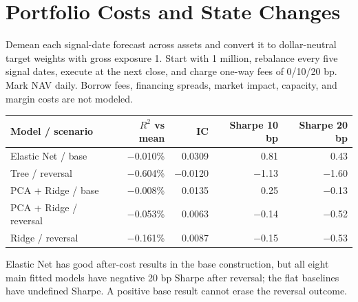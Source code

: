 \clearpage\section{Portfolio Costs and State Changes}
\begin{strand}
Demean each signal-date forecast across assets and convert it to dollar-neutral target weights with gross exposure 1. Start with 1 million, rebalance every five signal dates, execute at the next close, and charge one-way fees of 0/10/20 bp. Mark NAV daily. Borrow fees, financing spreads, market impact, capacity, and margin costs are not modeled.
\end{strand}
\begin{center}\small
\begin{tabular}{lrrrr}
\toprule
Model / scenario & \(R^2\) vs mean & IC & Sharpe 10 bp & Sharpe 20 bp\\
\midrule
Elastic Net / base & −0.010\% & 0.0309 & 0.81 & 0.43\\
Tree / reversal & −0.604\% & −0.0120 & −1.13 & −1.60\\
PCA + Ridge / base & −0.008\% & 0.0135 & 0.25 & −0.13\\
PCA + Ridge / reversal & −0.053\% & 0.0063 & −0.14 & −0.52\\
Ridge / reversal & −0.161\% & 0.0087 & −0.15 & −0.53\\
\bottomrule
\end{tabular}
\end{center}
Elastic Net has good after-cost results in the base construction, but all eight main fitted models have negative 20 bp Sharpe after reversal; the flat baselines have undefined Sharpe. A positive base result cannot erase the reversal outcome.

